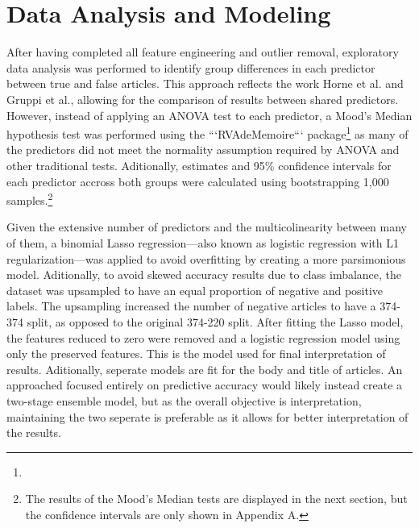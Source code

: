 \documentclass[../thesis.tex]{subfiles}
\begin{document}
\section{Data Analysis and Modeling}

After having completed all feature engineering and outlier removal, exploratory data analysis was performed to identify group differences in each predictor between true and false articles. This approach reflects the work Horne et al. and Gruppi et al., allowing for the comparison of results between shared predictors. However, instead of applying an ANOVA test to each predictor, a Mood's Median hypothesis test was performed using the ```RVAdeMemoire``` package\footnote{} as many of the predictors did not meet the normality assumption required by ANOVA and other traditional tests. Aditionally, estimates and 95\% confidence intervals for each predictor accross both groups were calculated using bootstrapping 1,000 samples.\footnote{The results of the Mood's Median tests are displayed in the next section, but the confidence intervals are only shown in Appendix A.}

Given the extensive number of predictors and the multicolinearity between many of them, a binomial Lasso regression---also known as logistic regression with L1 regularization---was applied to avoid overfitting by creating a more parsimonious model. Aditionally, to avoid skewed accuracy results due to class imbalance, the dataset was upsampled to have an equal proportion of negative and positive labels. The upsampling increased the number of negative articles to have a 374-374 split, as opposed to the original 374-220 split. After fitting the Lasso model, the features reduced to zero were removed and a logistic regression model using only the preserved features. This is the model used for final interpretation of results. Aditionally, seperate models are fit for the body and title of articles. An approached focused entirely on predictive accuracy would likely instead create a two-stage ensemble model, but as the overall objective is interpretation, maintaining the two seperate is preferable as it allows for better interpretation of the results.
\end{document}
